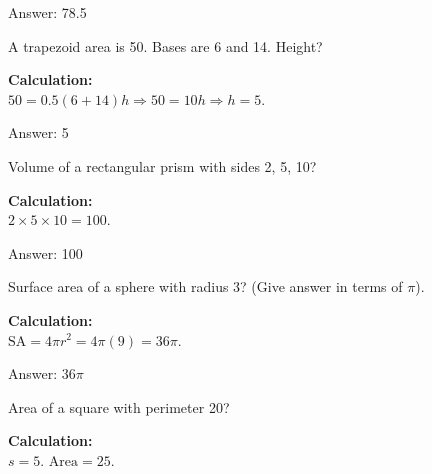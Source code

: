 \documentclass[11pt,paper=a4,answers]{exam}
\begin{document}
\begin{questions}
\begin{solution}
Answer: \colorbox{yellow!100}{78.5}
\end{solution}

\vspace{60pt}

\question
A trapezoid area is 50. Bases are 6 and 14. Height?

\begin{solution}
\textbf{Calculation:} \\
$50 = 0.5(6+14)h \Rightarrow 50 = 10h \Rightarrow h = 5$.

\vspace{30pt}

Answer: \colorbox{yellow!100}{5}
\end{solution}

\vspace{60pt}

\question
Volume of a rectangular prism with sides 2, 5, 10?

\begin{solution}
\textbf{Calculation:} \\
$2 \times 5 \times 10 = 100$.

\vspace{30pt}

Answer: \colorbox{yellow!100}{100}
\end{solution}

\vspace{60pt}

\question
Surface area of a sphere with radius 3? (Give answer in terms of $\pi$).

\begin{solution}
\textbf{Calculation:} \\
$\text{SA} = 4\pi r^2 = 4\pi(9) = 36\pi$.

\vspace{30pt}

Answer: \colorbox{yellow!100}{$36\pi$}
\end{solution}

\vspace{60pt}

\question
Area of a square with perimeter 20?

\begin{solution}
\textbf{Calculation:} \\
$s = 5$. $\text{Area} = 25$.


\end{solution}
\end{questions}
\end{document}
